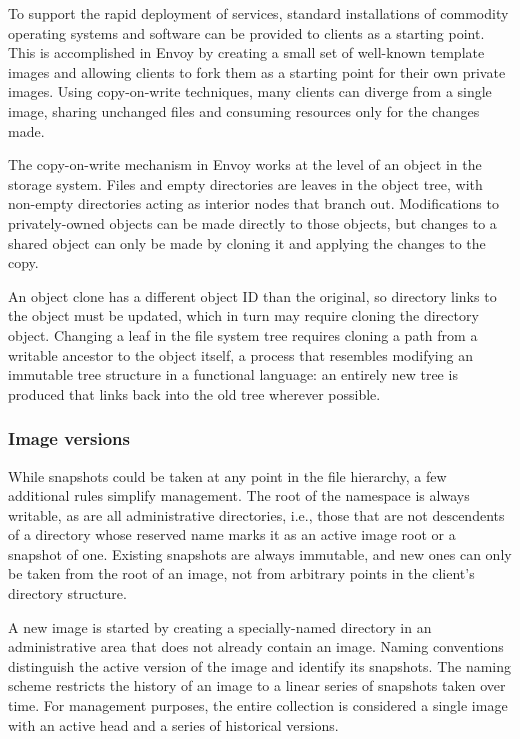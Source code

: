 To support the rapid deployment of services, standard installations of commodity operating systems and software can be provided to clients as a starting point. This is accomplished in Envoy by creating a small set of well-known template images and allowing clients to fork them as a starting point for their own private images. Using copy-on-write techniques, many clients can diverge from a single image, sharing unchanged files and consuming resources only for the changes made.

The copy-on-write mechanism in Envoy works at the level of an object in the storage system. Files and empty directories are leaves in the object tree, with non-empty directories acting as interior nodes that branch out. Modifications to privately-owned objects can be made directly to those objects, but changes to a shared object can only be made by cloning it and applying the changes to the copy.

An object clone has a different object ID than the original, so directory links to the object must be updated, which in turn may require cloning the directory object. Changing a leaf in the file system tree requires cloning a path from a writable ancestor to the object itself, a process that resembles modifying an immutable tree structure in a functional language: an entirely new tree is produced that links back into the old tree wherever possible.

\subsubsection{Image versions}

While snapshots could be taken at any point in the file hierarchy, a few additional rules simplify management. The root of the namespace is always writable, as are all administrative directories, i.e., those that are not descendents of a directory whose reserved name marks it as an active image root or a snapshot of one. Existing snapshots are always immutable, and new ones can only be taken from the root of an image, not from arbitrary points in the client's directory structure.

A new image is started by creating a specially-named directory in an administrative area that does not already contain an image. Naming conventions distinguish the active version of the image and identify its snapshots. The naming scheme restricts the history of an image to a linear series of snapshots taken over time. For management purposes, the entire collection is considered a single image with an active head and a series of historical versions.

